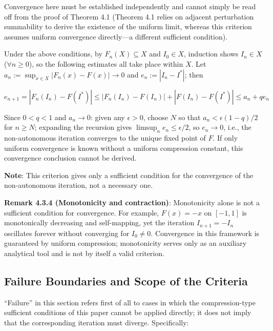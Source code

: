 \documentclass[11pt,a4paper]{amsart}
\begin{document}
Convergence here must be established independently and cannot simply be read off from the proof of Theorem 4.1 (Theorem 4.1 relies on adjacent perturbation summability to derive the existence of the uniform limit, whereas this criterion assumes uniform convergence directly---a different sufficient condition).

Under the above conditions, by $F_n(X) \subseteq X$ and $I_0 \in X$, induction shows $I_n \in X$ ($\forall n \ge 0$), so the following estimates all take place within $X$. Let $a_n := \sup_{x\in X}|F_n(x) - F(x)| \to 0$ and $e_n := |I_n - I^*|$; then

\begin{equation}
\label{eq:en-recursion}
e_{n+1} = |F_n(I_n) - F(I^*)| \le |F_n(I_n) - F(I_n)| + |F(I_n) - F(I^*)| \le a_n + qe_n
\end{equation}

Since $0 < q < 1$ and $a_n \to 0$: given any $\epsilon > 0$, choose $N$ so that $a_n < \epsilon(1-q)/2$ for $n \ge N$; expanding the recursion gives $\limsup_n e_n \le \epsilon/2$, so $e_n \to 0$, i.e., the non-autonomous iteration converges to the unique fixed point of $F$. If only uniform convergence is known without a uniform compression constant, this convergence conclusion cannot be derived.

\textbf{Note}: This criterion gives only a sufficient condition for the convergence of the non-autonomous iteration, not a necessary one.

\textbf{Remark 4.3.4 (Monotonicity and contraction)}: Monotonicity alone is not a sufficient condition for convergence. For example, $F(x) = -x$ on $[-1,1]$ is monotonically decreasing and self-mapping, yet the iteration $I_{n+1} = -I_n$ oscillates forever without converging for $I_0 \ne 0$. Convergence in this framework is guaranteed by uniform compression; monotonicity serves only as an auxiliary analytical tool and is not by itself a valid criterion.

\subsection{Failure Boundaries and Scope of the Criteria}

``Failure'' in this section refers first of all to cases in which the compression-type sufficient conditions of this paper cannot be applied directly; it does not imply that the corresponding iteration must diverge. Specifically:
\end{document}
